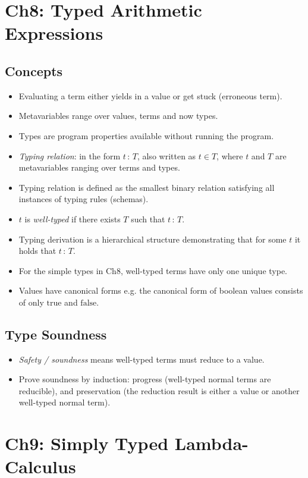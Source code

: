 \documentclass{article}
\newcommand{\mtrue}{\mathrm{true}}
\newcommand{\mfalse}{\mathrm{false}}
\begin{document}
\section{Ch8: Typed Arithmetic Expressions}
\subsection{Concepts}
  \begin{itemize}
    \item Evaluating a term either yields in a value or get stuck (erroneous term).
    \item Metavariables range over values, terms and now types.
    \item Types are program properties available without running the program.
    \item \emph{Typing relation}: in the form $t \, :\, T$, also written as $t \in T$,
      where $t$ and $T$ are metavariables ranging over terms and types.
    \item Typing relation is defined as the smallest binary relation satisfying all instances of typing rules (schemas).
    \item $t$ is \emph{well-typed} if there exists $T$ such that $t\, :\, T$.
    \item Typing derivation is a hierarchical structure demonstrating that for some $t$ it holds that $t\, :\, T$.
    \item For the simple types in Ch8, well-typed terms have only one unique type.
    \item Values have canonical forms e.g. the canonical form of boolean values consists of only $\mtrue$ and $\mfalse$.
  \end{itemize}

\subsection{Type Soundness}
  \begin{itemize}
    \item \emph{Safety / soundness} means well-typed terms must reduce to a value.
    \item Prove soundness by induction: progress (well-typed normal terms are reducible),
      and preservation (the reduction result is either a value or another well-typed normal term).
  \end{itemize}



\section{Ch9: Simply Typed Lambda-Calculus}
\end{document}
